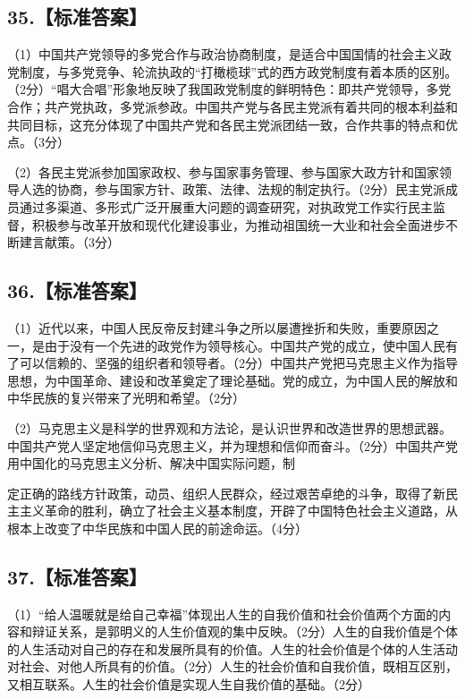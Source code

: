 \documentclass[UTF8,11pt]{ctexart}
\begin{document}
\subsection*{35.【标准答案】}

（1）中国共产党领导的多党合作与政治协商制度，是适合中国国情的社会主义政党制度，与多党竞争、轮流执政的“打橄榄球”式的西方政党制度有着本质的区别。（2分）“唱大合唱”形象地反映了我国政党制度的鲜明特色：即共产党领导，多党合作；共产党执政，多党派参政。中国共产党与各民主党派有着共同的根本利益和共同目标，这充分体现了中国共产党和各民主党派团结一致，合作共事的特点和优点。（3分）


（2）各民主党派参加国家政权、参与国家事务管理、参与国家大政方针和国家领导人选的协商，参与国家方针、政策、法律、法规的制定执行。（2分）民主党派成员通过多渠道、多形式广泛开展重大问题的调查研究，对执政党工作实行民主监督，积极参与改革开放和现代化建设事业，为推动祖国统一大业和社会全面进步不断建言献策。（3分）


\subsection*{36.【标准答案】}

（1）近代以来，中国人民反帝反封建斗争之所以屡遭挫折和失败，重要原因之一，是由于没有一个先进的政党作为领导核心。中国共产党的成立，使中国人民有了可以信赖的、坚强的组织者和领导者。（2分）中国共产党把马克思主义作为指导思想，为中国革命、建设和改革奠定了理论基础。党的成立，为中国人民的解放和中华民族的复兴带来了光明和希望。（2分）


（2）马克思主义是科学的世界观和方法论，是认识世界和改造世界的思想武器。中国共产党人坚定地信仰马克思主义，并为理想和信仰而奋斗。（2分）中国共产党用中国化的马克思主义分析、解决中国实际问题，制


定正确的路线方针政策，动员、组织人民群众，经过艰苦卓绝的斗争，取得了新民主主义革命的胜利，确立了社会主义基本制度，开辟了中国特色社会主义道路，从根本上改变了中华民族和中国人民的前途命运。（4分）


\subsection*{37.【标准答案】}

（1）“给人温暖就是给自己幸福”体现出人生的自我价值和社会价值两个方面的内容和辩证关系，是郭明义的人生价值观的集中反映。（2分）人生的自我价值是个体的人生活动对自己的存在和发展所具有的价值。人生的社会价值是个体的人生活动对社会、对他人所具有的价值。（2分）人生的社会价值和自我价值，既相互区别，又相互联系。人生的社会价值是实现人生自我价值的基础。（2分）
\end{document}

